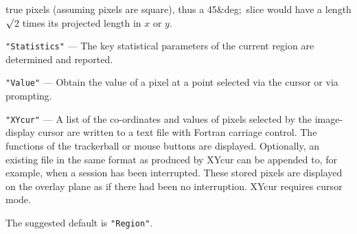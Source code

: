 \documentclass[twoside,11pt]{article}
\newcommand{\dgs}{\hbox{$^\circ$}}
\renewcommand{\dgs}{{\rawhtml &deg;}}
\begin{document}
{{{\begin{description}
                          true pixels (assuming pixels are square), thus
                          a 45\dgs\ slice would have a length $\surd$2
                          times its projected length in $x$ or $y$.
         \item {\tt "Statistics"} --- The key statistical parameters of the current
                          region are determined and reported.
         \item {\tt "Value"} --- Obtain the value of a pixel at a point selected
                          via the cursor or via prompting.
         \item {\tt "XYcur"} --- A list of the co-ordinates and values of pixels
                          selected by the image-display cursor are
                          written to a text file with Fortran carriage
                          control. The functions of the trackerball or
                          mouse buttons are displayed.  Optionally, an
                          existing file in the same format as produced
                          by XYcur can be appended to, for example, when
                          a session has been interrupted.  These stored
                          pixels are displayed on the overlay plane as
                          if there had been no interruption.  XYcur
                          requires cursor mode.
         \end{description}
         The suggested default is {\tt "Region"}.

}}}
\end{document}
